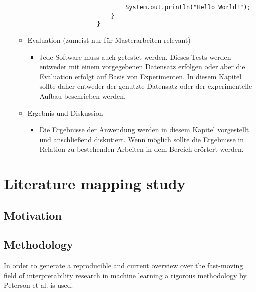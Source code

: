 \begin{itemize}
\begin{itemize}
\begin{itemize}
\begin{lstlisting}
						System.out.println("Hello World!");
					}
				}
				\end{lstlisting} 
			\end{itemize}
		\item Evaluation (zumeist nur für Masterarbeiten relevant)
		\begin{itemize}
			\item Jede Software muss auch getestet werden. Dieses Tests werden entweder mit einem vorgegebenen Datensatz erfolgen oder aber die Evaluation erfolgt auf Basis von Experimenten. In diesem Kapitel sollte daher entweder der genutzte Datensatz oder der experimentelle Aufbau beschrieben werden. 
		\end{itemize}
		\item Ergebnis und Diskussion
		\begin{itemize}
			\item Die Ergebnisse der Anwendung werden in diesem Kapitel vorgestellt und anschließend diskutiert. Wenn möglich sollte die Ergebnisse in Relation zu bestehenden Arbeiten in dem Bereich erörtert werden.
		\end{itemize}
	\end{itemize}  
\end{itemize}

\chapter{Literature mapping study}

\section{Motivation}

\section{Methodology}
In order to generate a reproducible and current overview over the fast-moving field of interpretability research in machine learning a rigorous methodology by Peterson et al. \cite{petersenSystematicMappingStudies} is used. 

